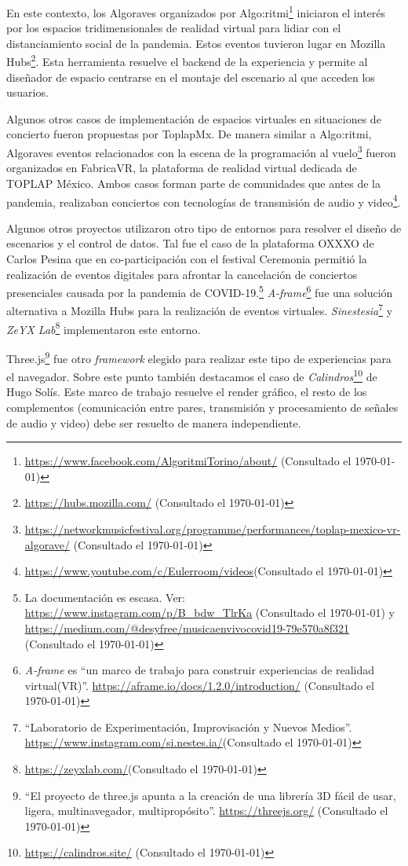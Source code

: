 En este contexto, los Algoraves organizados por Algo:ritmi\footnote{\url{https://www.facebook.com/AlgoritmiTorino/about/} (Consultado el \today)} iniciaron el interés por los espacios tridimensionales de realidad virtual para lidiar con el distanciamiento social de la pandemia. Estos eventos tuvieron lugar en Mozilla Hubs\footnote{\url{https://hubs.mozilla.com/} (Consultado el \today)}. Esta herramienta resuelve el backend de la experiencia y permite al diseñador de espacio centrarse en el montaje del escenario al que acceden los usuarios.

Algunos otros casos de implementación de espacios virtuales en situaciones de concierto fueron propuestas por ToplapMx. De manera similar a Algo:ritmi, Algoraves eventos relacionados con la escena de la programación al vuelo\footnote{\url{https://networkmusicfestival.org/programme/performances/toplap-mexico-vr-algorave/} (Consultado el \today)} fueron organizados en FabricaVR, la plataforma de realidad virtual dedicada de TOPLAP México. Ambos casos forman parte de comunidades que antes de la pandemia, realizaban conciertos con tecnologías de transmisión de audio y video\footnote{\url{https://www.youtube.com/c/Eulerroom/videos}(Consultado el \today)}.%

Algunos otros proyectos utilizaron otro tipo de entornos para resolver el diseño de escenarios y el control de datos. Tal fue el caso de la plataforma OXXXO de Carlos Pesina que en co-participación con el festival Ceremonia permitió la realización de eventos digitales para afrontar la cancelación de conciertos presenciales causada por la pandemia de COVID-19.\footnote{La documentación es escasa. Ver: \url{https://www.instagram.com/p/B_bdw_TlrKa} (Consultado el \today) y \url{https://medium.com/@desyfree/musicaenvivocovid19-79e570a8f321} (Consultado el \today)} \textit{A-frame}\footnote{\textit{A-frame} es ``un marco de trabajo para construir experiencias de realidad virtual(VR)''. \url{https://aframe.io/docs/1.2.0/introduction/} (Consultado el \today)} fue una solución alternativa a Mozilla Hubs para la realización de eventos virtuales. \textit{Sinestesia}\footnote{``Laboratorio de Experimentación, Improvisación y Nuevos Medios''. \url{https://www.instagram.com/si.nestes.ia/}(Consultado el \today)} y \textit{ZeYX Lab}\footnote{\url{https://zeyxlab.com/}(Consultado el \today)} implementaron este entorno.

Three.js\footnote{``El proyecto de three.js apunta a la creación de una librería 3D fácil de usar, ligera, multinavegador, multipropósito''. \url{https://threejs.org/} (Consultado el \today)} fue otro \textit{framework} elegido para realizar este tipo de experiencias para el navegador. Sobre este punto también destacamos el caso de \textit{Calindros}\footnote{\url{https://calindros.site/} (Consultado el \today)} de Hugo Solís. Este marco de trabajo resuelve el render gráfico, el resto de los complementos (comunicación entre pares, transmisión y procesamiento de señales de audio y video) debe ser resuelto de manera independiente. %

